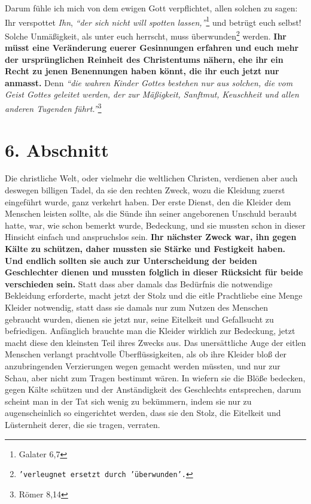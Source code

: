 \medskip

Darum fühle ich mich von dem ewigen Gott verpflichtet, allen solchen zu sagen:
Ihr verspottet \textit{Ihn},
\textit{"`der sich nicht will spotten lassen,"'}\footnote{Galater 6,7}
und betrügt euch selbst! Solche Unmäßigkeit, als unter
euch herrscht, muss
überwunden\footnote{\texttt{'verleugnet ersetzt durch 'überwunden'.}} werden.
\label{ref:14_06_wahre_nachfolger_umkehr}
\textbf{Ihr müsst eine Veränderung euerer Gesinnungen erfahren und euch
mehr der ursprünglichen Reinheit des Christentums nähern, ehe ihr ein Recht zu
jenen Benennungen haben könnt, die ihr euch jetzt nur anmasst.}
 Denn
\textit{"`die wahren
Kinder Gottes bestehen nur aus solchen, die vom Geist Gottes geleitet werden,
der zur Mäßigkeit, Sanftmut, Keuschheit und allen anderen Tugenden
führt."'}\footnote{Römer 8,14}

\section{6. Abschnitt} \label{kap14_ab6}

Die christliche Welt, oder vielmehr die weltlichen
Christen,
verdienen aber auch
deswegen billigen Tadel, da sie den rechten Zweck, wozu die Kleidung zuerst
eingeführt wurde, ganz verkehrt haben. Der erste Dienst, den die Kleider dem
Menschen leisten sollte, als die Sünde ihn seiner angeborenen Unschuld beraubt
hatte, war, wie schon bemerkt wurde, Bedeckung, und sie mussten schon in dieser
Hinsicht einfach und anspruchslos sein. \textbf{Ihr nächster Zweck war, ihn
gegen Kälte
zu schützen, daher mussten sie Stärke und Festigkeit haben. Und endlich sollten
sie auch zur Unterscheidung der beiden Geschlechter dienen und mussten folglich
in dieser Rücksicht für beide verschieden sein.} Statt dass aber
damals das
Bedürfnis die notwendige Bekleidung erforderte, macht jetzt der Stolz und die
eitle Prachtliebe eine Menge Kleider notwendig, statt dass sie damals nur zum
Nutzen des Menschen gebraucht wurden, dienen sie jetzt nur, seine
Eitelkeit und
Gefallsucht zu befriedigen. Anfänglich brauchte man die Kleider wirklich zur
Bedeckung, jetzt macht diese den kleinsten Teil ihres Zwecks aus. Das
unersättliche Auge der eitlen Menschen verlangt prachtvolle Überflüssigkeiten,
als ob ihre Kleider bloß der anzubringenden Verzierungen wegen gemacht werden
müssten, und nur zur Schau, aber nicht zum Tragen bestimmt wären. In wiefern sie
die Blöße bedecken, gegen Kälte schützen und der Anständigkeit des Geschlechts
entsprechen, darum scheint man in der Tat sich wenig zu bekümmern, indem
sie nur zu augenscheinlich so eingerichtet werden, dass sie den Stolz, die
Eitelkeit und Lüsternheit derer, die sie tragen, verraten.

